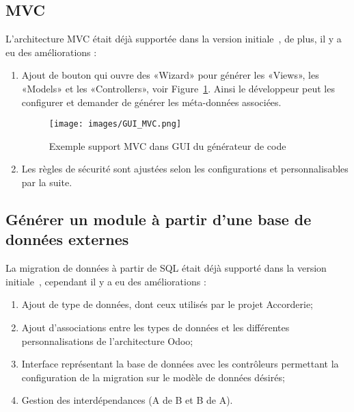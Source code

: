 \subsection{MVC}

L’architecture MVC était déjà supportée dans la version initiale~\cite{bluiksnot_repo}, de plus, il y a eu des améliorations : 

\begin{enumerate}
 \item Ajout de bouton qui ouvre des «Wizard» pour générer les «Views», les «Models» et les «Controllers», voir Figure~\ref{fig:dia_gui_mvc}. Ainsi le développeur peut les configurer et demander de générer les méta-données associées.
    \begin{figure}[htb]
    \centering
    \texttt{[image: images/GUI\_MVC.png]}
    \caption{Exemple support MVC dans GUI du générateur de code}
    \label{fig:dia_gui_mvc}
    \end{figure}
 \item Les règles de sécurité sont ajustées selon les configurations et personnalisables par la suite.
\end{enumerate}

\subsection{Générer un module à partir d’une base de données externes}


La migration de données à partir de SQL était déjà supporté dans la version initiale~\cite{bluiksnot_repo}, cependant il y a eu des améliorations : 

\begin{enumerate}
    \item Ajout de type de données, dont ceux utilisés par le projet Accorderie;
    \item Ajout d'associations entre les types de données et les différentes personnalisations de l’architecture Odoo;
    \item Interface représentant la base de données avec les contrôleurs permettant la configuration de la migration sur le modèle de données désirés;
    \item Gestion des interdépendances (A de B et B de A).
\end{enumerate}

